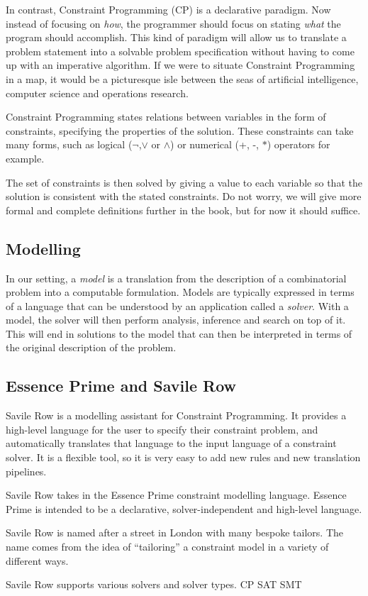 In contrast, Constraint Programming (CP) is a declarative paradigm. Now instead
of focusing on \emph{how}, the programmer should focus on stating \emph{what}
the program should accomplish. This kind of paradigm will allow us to translate
a problem statement into a solvable problem specification without having to
come up with an imperative algorithm.  If we were to situate Constraint
Programming in a map, it would be a picturesque isle between the seas of
artificial intelligence, computer science and operations research.

Constraint Programming states relations between variables in the form of
constraints, specifying the properties of the solution. These constraints can
take many forms, such as logical ($\neg$,$\vee$ or $\wedge$) or numerical (+,
-, $*$) operators for example.

The set of constraints is then solved by giving a value to each variable so
that the solution is consistent with the stated constraints.  Do not worry, we
will give more formal and complete definitions further in the book, but for now
it should suffice.

\subsection{Modelling}

In our setting, a \emph{model} is a translation from the description of a
combinatorial problem into a computable formulation. Models are typically
expressed in terms of a language that can be understood by an application
called a \emph{solver}. With a model, the solver will then perform analysis, 
inference and search on top of it. This will end in solutions to the model that
can then be interpreted in terms of the original description of the problem. 


\subsection{Essence Prime and Savile Row}

Savile Row is a modelling assistant for Constraint Programming. It provides a
high-level language for the user to specify their constraint problem, and
automatically translates that language to the input language of a constraint
solver. It is a flexible tool, so it is very easy to add new rules and new
translation pipelines.

Savile Row takes in the Essence Prime constraint modelling language. Essence
Prime is intended to be a declarative, solver-independent and high-level language. 

Savile Row is named after a street in London with many bespoke tailors. The
name comes from the idea of ``tailoring'' a constraint model in a variety of
different ways.


Savile Row supports various solvers and solver types.
CP
SAT
SMT


